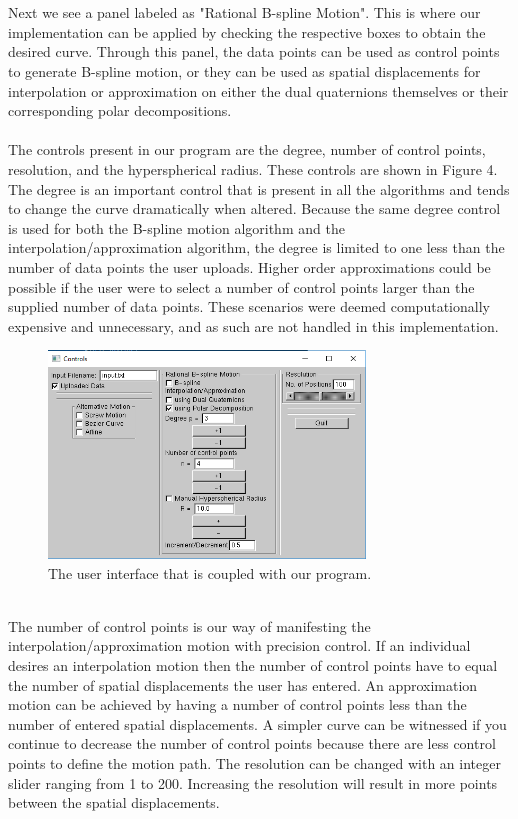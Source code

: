 \documentclass[11pt]{article}
\begin{document}
\\
\\
Next we see a panel labeled as "Rational B-spline Motion". This is where our implementation can be applied by checking the respective boxes to obtain the desired curve. Through this panel, the data points can be used as control points to generate B-spline motion, or they can be used as spatial displacements for interpolation or approximation on either the dual quaternions themselves or their corresponding polar decompositions.
\\
\\
The controls present in our program are the degree, number of control points, resolution, and the hyperspherical radius. These controls are shown in Figure 4. The degree is an important control that is present in all the algorithms and tends to change the curve dramatically when altered. Because the same degree control is used for both the B-spline motion algorithm and the interpolation/approximation algorithm, the degree is limited to one less than the number of data points the user uploads. Higher order approximations could be possible if the user were to select a number of control points larger than the supplied number of data points. These scenarios were deemed computationally expensive and unnecessary, and as such are not handled in this implementation.
\\
\begin{figure}[h]
  \centering
  \includegraphics[width=0.75\textwidth]{GUI.png}
  \caption{The user interface that is coupled with our program. }\label{Figure: 4}
\end{figure}
\\
The number of control points is our way of manifesting the interpolation/approximation motion with precision control. If an individual desires an interpolation motion then the number of control points have to equal the number of spatial displacements the user has entered. An approximation motion can be achieved by having a number of control points less than the number of entered spatial displacements. A simpler curve can be witnessed if you continue to decrease the number of control points because there are less control points to define the motion path. The resolution can be changed with an integer slider ranging from 1 to 200. Increasing the resolution will result in more points between the spatial displacements.
\end{document}
